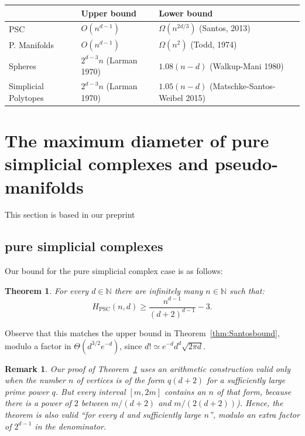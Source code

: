 \documentclass[12pt,a4paper]{article}
\newcommand{\PSC}{{\textrm{PSC}}}
\newcommand{\N}{\mathbb N}
\theoremstyle{plain}
\newtheorem{theorem}{Theorem}
\newtheorem*{remark}{Remark}
\theoremstyle{definition}
\begin{document}
\begin{center}
\begin{tabular}{p{2cm}|p{4cm}|p{4cm}|}
  &Upper bound & Lower bound \\ \hline
  PSC & $O(n^{d-1})$ & $\Omega(n^{2d/3})$ \newline (Santos, 2013) \\\hline
  P. Manifolds & $O(n^{d-1})$& $\Omega(n^2)$ \newline (Todd, 1974)\\\hline
  Spheres & $2^{d-3}n $ \newline(Larman 1970) & $1.08(n-d)$ \newline(Walkup-Mani 1980) \\\hline
  Simplicial Polytopes & $2^{d-3}n$ \newline(Larman 1970) & $1.05(n-d)$ \newline(Matschke-Santos-Weibel 2015) \\\hline
\end{tabular}
\end{center}

\section{The maximum diameter of pure simplicial complexes and pseudo-manifolds}
\label{sec:mypaper}
This section is based in our preprint~\cite{mypaper}

\subsection{pure simplicial complexes}
Our bound for the pure simplicial complex case is as follows:

\begin{theorem}
\label{thm:pure_complexes}
For every $d\in \N$ there are infinitely many $n\in\N$ such that:
\[
  H_\PSC(n,d) \ge \frac{n^{d-1}}{(d+2)^{d-1}}-3.
\]
\end{theorem}
Observe that this matches the upper bound in Theorem~\ref{thm:Santosbound}, modulo a factor %
in $\Theta(d^{3/2}e^{-d})$, since $d!\simeq e^{-d}d^d \sqrt{2\pi d}$.

\begin{remark}
Our proof of Theorem~\ref{thm:pure_complexes} uses an arithmetic construction valid only when the number $n$ of vertices is of the form $q(d+2)$ for a sufficiently large prime power $q$. 
But every interval $[m,2m]$ contains an $n$ of that form, because there is a power of $2$ between $m/(d+2)$ and $m/(2(d+2))$). 
Hence, the theorem is also valid ``for every $d$ and sufficiently large $n$'', modulo an extra factor of $2^{d-1}$ in the denominator.
\end{remark}
\end{document}
